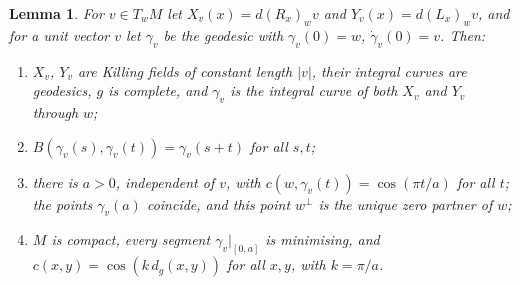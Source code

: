 \documentclass[11pt,reqno]{amsart}
\newtheorem{lemma}[theorem]{Lemma}
\theoremstyle{definition}
\theoremstyle{remark}
\numberwithin{equation}{section}
\begin{document}
\begin{lemma}\label{lem:roundgeo}
For $v\in T_wM$ let $X_v(x)=d(R_x)_wv$ and $Y_v(x)=d(L_x)_wv$, and for a unit vector $v$ let $\gamma_v$ be the geodesic with $\gamma_v(0)=w$,
$\dot\gamma_v(0)=v$.  Then:
\begin{enumerate}[label=(\roman*)]
\item $X_v$, $Y_v$ are Killing fields of constant length $\lvert v\rvert$, their integral curves are geodesics, $g$ is complete, and $\gamma_v$
is the integral curve of both $X_v$ and $Y_v$ through $w$;
\item $B(\gamma_v(s),\gamma_v(t))=\gamma_v(s+t)$ for all $s,t$;
\item there is $a>0$, independent of $v$, with $c(w,\gamma_v(t))=\cos(\pi t/a)$ for all $t$; the points $\gamma_v(a)$ coincide, and this point $w^\perp$
is the unique zero partner of $w$;
\item $M$ is compact, every segment $\gamma_v|_{[0,a]}$ is minimising, and $c(x,y)=\cos(k\,d_g(x,y))$ for all $x,y$, with $k=\pi/a$.
\end{enumerate}
\end{lemma}
\end{document}
